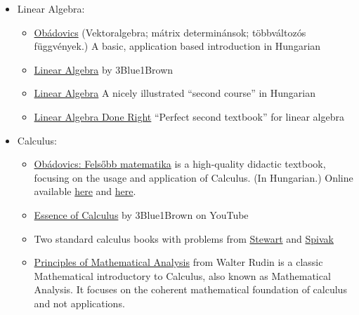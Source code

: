 \documentclass{article}
\begin{document}
\begin{itemize}
    \item Linear Algebra:
    \begin{itemize}
        \item \href{https://www.scolar.hu/vektoralgebra_matrixok_determinansok_tobbvaltozos_fuggvenyek_1820}{Obádovics} (Vektoralgebra; mátrix determinánsok; többváltozós függvények.) A basic, application based introduction in Hungarian
        
        \item \href{https://www.youtube.com/playlist?list=PLZHQObOWTQDPD3MizzM2xVFitgF8hE_ab}{Linear Algebra} by 3Blue1Brown
        
        
        \item \href{https://web.archive.org/web/20160717031653/http://tankonyvtar.ttk.bme.hu/pdf/14.pdf}{Linear Algebra} A nicely illustrated ``second course'' in Hungarian
        
        \item \href{https://www.goodreads.com/book/show/309768.Linear_Algebra_Done_Right}{Linear Algebra Done Right} ``Perfect second textbook'' for linear algebra
    \end{itemize}
    
    \item Calculus:
    \begin{itemize}
        \item \href{https://moly.hu/konyvek/obadovics-j-gyula-szarka-zoltan-felsobb-matematika}{Obádovics: Felsőbb matematika} is a high-quality didactic textbook, focusing on the usage and application of Calculus. (In Hungarian.) Online available \href{https://www.scribd.com/doc/96616339/Obadovics-J-Gyula-Fels\%C5\%91bb-matematika}{here} and \href{https://datagrid.hu/boda/Boda-sajat/Rush/Matek/obadovics_felsobb_matematika.pdf}{here}.
        
        \item \href{https://www.youtube.com/watch?v=WUvTyaaNkzM&list=PLZHQObOWTQDMsr9K-rj53DwVRMYO3t5Yr}{Essence of Calculus} by  3Blue1Brown on YouTube
        
        \item Two standard calculus books with problems from \href{https://www.goodreads.com/book/show/61298.Calculus}{Stewart} and \href{https://www.goodreads.com/book/show/328645.Calculus}{Spivak}
        
        \item \href{https://www.goodreads.com/book/show/292079.Principles_of_Mathematical_Analysis}{Principles of Mathematical Analysis} from Walter Rudin is a classic Mathematical introductory to Calculus, also known as Mathematical Analysis. It focuses on the coherent mathematical foundation of calculus and not applications.
        

\end{itemize}
\end{itemize}
\end{document}
